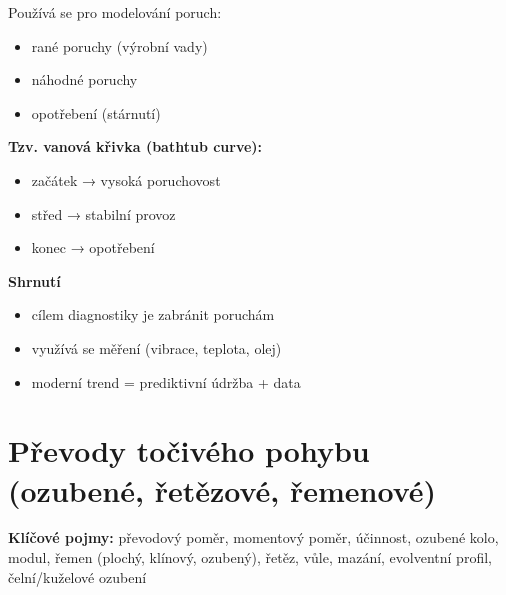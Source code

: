 \documentclass[a4paper,10pt]{article}
\begin{document}
\begin{vysvetlenibox}
Používá se pro modelování poruch:

\begin{itemize}
\item rané poruchy (výrobní vady)
\item náhodné poruchy
\item opotřebení (stárnutí)
\end{itemize}

\textbf{Tzv. vanová křivka (bathtub curve):}
\begin{itemize}
\item začátek → vysoká poruchovost
\item střed → stabilní provoz
\item konec → opotřebení
\end{itemize}

\textbf{Shrnutí}

\begin{itemize}
\item cílem diagnostiky je zabránit poruchám
\item využívá se měření (vibrace, teplota, olej)
\item moderní trend = prediktivní údržba + data
\end{itemize}

\end{vysvetlenibox}

\newpage

\section{Převody točivého pohybu (ozubené, řetězové, řemenové)}

\begin{pojmybox}
\textbf{Klíčové pojmy:}
převodový poměr, momentový poměr, účinnost, ozubené kolo,
modul, řemen (plochý, klínový, ozubený), řetěz,
vůle, mazání, evolventní profil, čelní/kuželové ozubení
\end{pojmybox}
\end{document}
